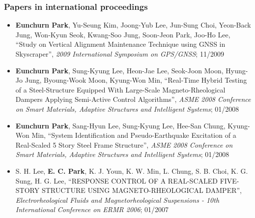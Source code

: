 \subsubsection*{Papers in international proceedings}
\begin{itemize}
\item[]
  \textbf{Eunchurn Park}, Yu-Seung Kim, Joong-Yub Lee, Jun-Sung Choi,
  Yeon-Back Jung, Won-Kyun Seok, Kwang-Soo Jung, Soon-Jeon Park, Joo-Ho
  Lee, ``Study on Vertical Alignment Maintenance Technique using GNSS in
  Skyscraper'', \emph{2009 International Symposium on GPS/GNSS}; 11/2009
\item[]
  \textbf{Eunchurn Park}, Sung-Kyung Lee, Heon-Jae Lee, Seok-Joon Moon,
  Hyung-Jo Jung, Byoung-Wook Moon, Kyung-Won Min, ``Real-Time Hybrid
  Testing of a Steel-Structure Equipped With Large-Scale
  Magneto-Rheological Dampers Applying Semi-Active Control Algorithms'',
  \emph{ASME 2008 Conference on Smart Materials, Adaptive Structures and
  Intelligent Systems}; 01/2008
\item[]
  \textbf{Eunchurn Park}, Sang-Hyun Lee, Sung-Kyung Lee, Hee-San Chung,
  Kyung-Won Min, ``System Identification and Pseudo-Earthquake
  Excitation of a Real-Scaled 5 Story Steel Frame Structure'',
  \emph{ASME 2008 Conference on Smart Materials, Adaptive Structures and
  Intelligent Systems}; 01/2008
\item[]
  S. H. Lee, \textbf{E. C. Park}, K. J. Youn, K. W. Min, L. Chung, S. B.
  Choi, K. G. Sung, H. G. Lee, ``RESPONSE CONTROL OF A REAL-SCALED
  FIVE-STORY STRUCTURE USING MAGNETO-RHEOLOGICAL DAMPER'',
  \emph{Electrorheological Fluids and Magnetorheological Suspensions -
  10th International Conference on ERMR 2006}; 01/2007
\end{itemize}

